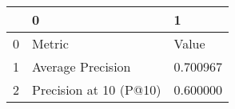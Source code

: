 \begin{tabular}{lll}
\toprule
 & 0 & 1 \\
\midrule
0 & Metric & Value \\
1 & Average Precision & 0.700967 \\
2 & Precision at 10 (P@10) & 0.600000 \\
\bottomrule
\end{tabular}
